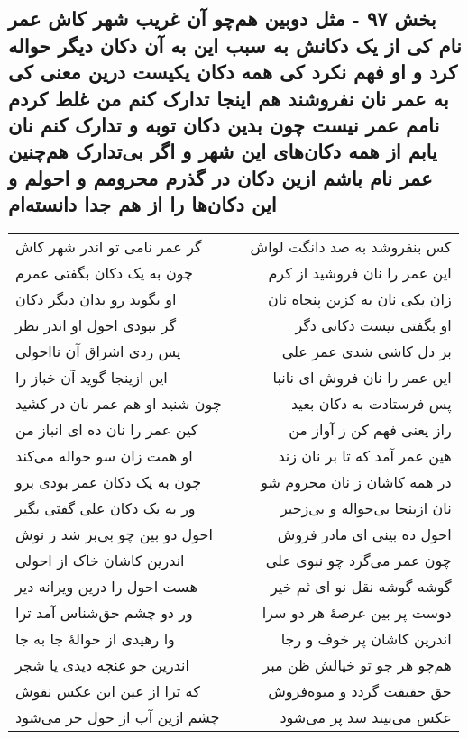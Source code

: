 \begin{center}
\section*{بخش ۹۷ - مثل دوبین هم‌چو آن غریب شهر کاش عمر نام کی از یک دکانش به سبب این به آن دکان دیگر حواله کرد و او فهم نکرد کی همه  دکان یکیست درین معنی کی به عمر نان نفروشند هم اینجا تدارک کنم  من غلط کردم نامم عمر نیست چون بدین دکان توبه و تدارک کنم نان  یابم از همه دکان‌های این شهر و اگر بی‌تدارک هم‌چنین عمر نام باشم  ازین دکان در گذرم محرومم و احولم و این دکان‌ها را از هم جدا دانسته‌ام}
\label{sec:sh097}
\begin{longtable}{l p{0.5cm} r}
گر عمر نامی تو اندر شهر کاش
&&
کس بنفروشد به صد دانگت لواش
\\
چون به یک دکان بگفتی عمرم
&&
این عمر را نان فروشید از کرم
\\
او بگوید رو بدان دیگر دکان
&&
زان یکی نان به کزین پنجاه نان
\\
گر نبودی احول او اندر نظر
&&
او بگفتی نیست دکانی دگر
\\
پس ردی اشراق آن نااحولی
&&
بر دل کاشی شدی عمر علی
\\
این ازینجا گوید آن خباز را
&&
این عمر را نان فروش ای نانبا
\\
چون شنید او هم عمر نان در کشید
&&
پس فرستادت به دکان بعید
\\
کین عمر را نان ده ای انباز من
&&
راز یعنی فهم کن ز آواز من
\\
او همت زان سو حواله می‌کند
&&
هین عمر آمد که تا بر نان زند
\\
چون به یک دکان عمر بودی برو
&&
در همه کاشان ز نان محروم شو
\\
ور به یک دکان علی گفتی بگیر
&&
نان ازینجا بی‌حواله و بی‌زحیر
\\
احول دو بین چو بی‌بر شد ز نوش
&&
احول ده بینی ای مادر فروش
\\
اندرین کاشان خاک از احولی
&&
چون عمر می‌گرد چو نبوی علی
\\
هست احول را درین ویرانه دیر
&&
گوشه گوشه نقل نو ای ثم خیر
\\
ور دو چشم حق‌شناس آمد ترا
&&
دوست پر بین عرصهٔ هر دو سرا
\\
وا رهیدی از حوالهٔ جا به جا
&&
اندرین کاشان پر خوف و رجا
\\
اندرین جو غنچه دیدی یا شجر
&&
هم‌چو هر جو تو خیالش ظن مبر
\\
که ترا از عین این عکس نقوش
&&
حق حقیقت گردد و میوه‌فروش
\\
چشم ازین آب از حول حر می‌شود
&&
عکس می‌بیند سد پر می‌شود

\end{longtable}
\end{center}
